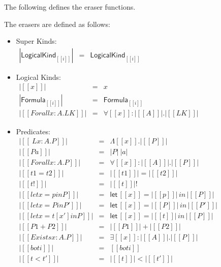 \documentclass[phd,appendix,dedicationpage,ackpage,epigraphpage]{uithesis}
\begin{document}
\noindent
The following defines the eraser functions.
\begin{definition}
  \label{def:eraser_function}
  The erasers are defined as follows:
  \begin{itemize}
  \item Super Kinds:\\
    \begin{math}
      \begin{array}{lll}
        |\mathsf{LogicalKind}_{[[i]]}| & = & \mathsf{LogicalKind}_{[[i]]}
      \end{array}
    \end{math}
  \item Logical Kinds:\\
    \begin{math}
      \begin{array}{lll}
        |[[x]]|                   & = & x\\
        |\mathsf{Formula}_{[[i]]}| & = & \mathsf{Formula}_{{[[i]]}}\\
        |[[Forall x : A . LK]]|   & = & \forall [[x]] : |[[A]]|.|[[LK]]|
      \end{array}
    \end{math}
    
  \item Predicates:\\
    \begin{math}
      \begin{array}{lll}
        |[[\ L x : A . P]]|       & = & \Lambda [[x]] . |[[P]]|\\
        |[[P a]]|                 & = & |P|\ |a|\\
        |[[Forall x : A . P]]|    & = & \forall [[x]]:|[[A]]|.|[[P]]|\\
        |[[t1 = t2]]|             & = & |[[t1]]| = |[[t2]]|\\
        |[[t !]]|                 & = & |[[t]]|!\\
        |[[let x = p in P]]|      & = & \mathsf{let}\,[[x]] = |[[p]]|\,in\,|[[P]]|\\
        |[[let x = P in P']]|     & = & \mathsf{let}\,[[x]] = |[[P]]|\,in\,|[[P']]|\\
        |[[let x = t [x'] in P]]| & = & \mathsf{let}\,[[x]] = |[[t]]|\,in\,|[[P]]|\\
        |[[P1 + P2]]|             & = & |[[P1]]| + |[[P2]]|\\
        |[[Exists x : A . P]]|    & = & \exists [[x]]:|[[A]]|.|[[P]]|\\
        |[[bot i]]|               & = & [[bot i]]\\
        |[[t < t']]|              & = & |[[t]]| < |[[t']]|
      \end{array}
    \end{math}
    

\end{itemize}
\end{definition}
\end{document}
